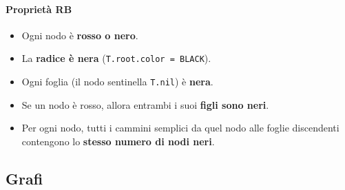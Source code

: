 \paragraph{Proprietà RB}
\begin{itemize}
    \item Ogni nodo è \textbf{rosso o nero}.
    \item La \textbf{radice è nera} (\texttt{T.root.color = BLACK}).
    \item Ogni foglia (il nodo sentinella \texttt{T.nil}) è \textbf{nera}.
    \item Se un nodo è rosso, allora entrambi i suoi \textbf{figli sono neri}.
    \item Per ogni nodo, tutti i cammini semplici da quel nodo alle foglie discendenti contengono lo \textbf{stesso numero di nodi neri}.
\end{itemize}

\subsection{Grafi}

